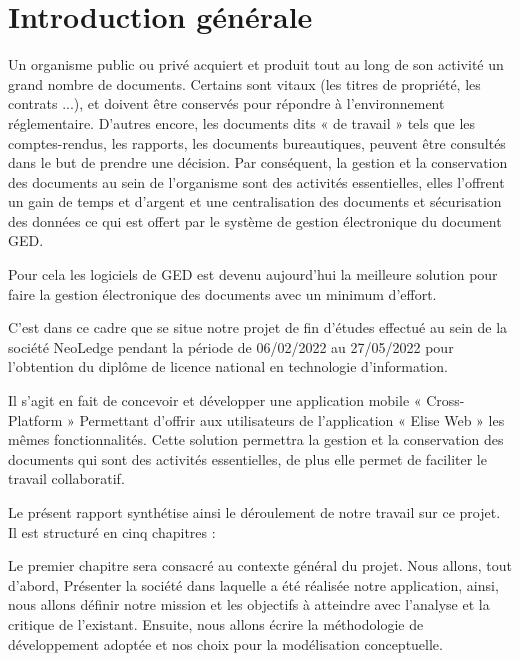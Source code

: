 \chapter*{Introduction générale}
\label{chap:introduction}

Un organisme public ou privé acquiert et produit tout au long de son activité un grand nombre de documents. Certains sont vitaux (les titres de propriété, les contrats ...), et doivent être conservés pour répondre à l'environnement réglementaire. D'autres encore, les documents dits « de travail » tels que les comptes-rendus, les rapports, les documents bureautiques, peuvent être consultés dans le but de prendre une décision. Par conséquent, la gestion et la conservation des documents au sein de l'organisme sont des activités essentielles, elles l'offrent un gain de temps et d'argent et une centralisation des documents et sécurisation des données ce qui est offert par le système de gestion électronique du document GED.
\medskip

Pour cela les logiciels de GED est devenu aujourd'hui la meilleure solution pour faire la gestion électronique des documents avec un minimum d'effort.
\medskip

C'est dans ce cadre que se situe notre projet de fin d'études effectué au sein de la société NeoLedge pendant la période de 06/02/2022 au 27/05/2022 pour l'obtention du diplôme de licence national en technologie d'information.
\medskip

Il s'agit en fait de concevoir et développer une application mobile « Cross-Platform » Permettant d'offrir aux utilisateurs de l'application « Elise Web » les mêmes fonctionnalités. Cette solution permettra la gestion et la conservation des documents qui sont des activités essentielles, de plus elle permet de faciliter le travail collaboratif.

\medskip
Le présent rapport synthétise ainsi le déroulement de notre travail sur ce projet. Il est structuré en cinq chapitres :

\medskip
Le premier chapitre sera consacré au contexte général du projet. Nous allons, tout d'abord, Présenter la société dans laquelle a été réalisée notre application, ainsi, nous allons définir notre mission et les objectifs à atteindre avec l'analyse et la critique de l'existant. Ensuite, nous allons écrire la méthodologie de développement adoptée et nos choix pour la modélisation conceptuelle. 

